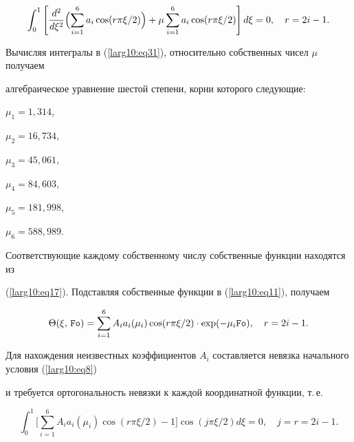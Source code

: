 \begin{equation}

\label{larg10:eq31}

\int _0^1 

\left[

\frac{d^2}{d\xi^2} \Bigl( \sum \limits_{i=1}^6 a_i \cos (r {\pi }\xi/{2}) \Bigr) + \mu \sum\limits_{i=1}^6 a_i \cos (r {\pi }\xi/2) \right]

d\xi =0,\quad r=2i-1.

\end{equation}

Вычисляя  интегралы в (\ref{larg10:eq31}), относительно собственных чисел $\mu $ получаем

алгебраическое уравнение шестой степени, корни которого следующие:

$\mu_1 = 1,314$,

$\mu_2 = 16,734$,

$\mu_3 = 45,061$,

$\mu_4 = 84,603$,

$\mu_5 = 181,998$,

$\mu_6 = 588,989$.





Соответствующие каждому собственному числу собственные функции находятся из

(\ref{larg10:eq17}). Подставляя собственные функции в (\ref{larg10:eq11}), получаем

\begin{equation}

\label{larg10:eq331}

\Theta (\xi,\,{\tt Fo}) = \sum\limits_{i=1}^6 A_i a_i (\mu_i)\cos (r{\pi }\xi/2 )\cdot  \exp (-\mu_i {\tt Fo}),\quad r=2i-1.

\end{equation}



Для нахождения неизвестных коэффициентов $A_i$ составляется невязка начального условия (\ref{larg10:eq8})

и требуется ортогональность невязки к каждой координатной функции, т.\,е.

\begin{equation}

\label{larg10:eq341}

\int _0^1 \biggl[ \sum\limits_{i=1}^6 A_i a_i (\mu_i) \cos (r {\pi} \xi/2) - 1 \biggr] \cos (j{\pi }\xi/2) d \xi =0,

\quad j=r= 2i-1.

\end{equation}


